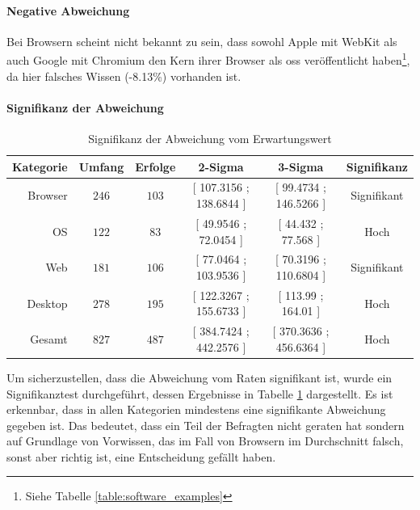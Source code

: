 \documentclass[a4paper]{article}
\begin{document}
                \paragraph{Negative Abweichung}
                    Bei Browsern scheint nicht bekannt zu sein, dass sowohl Apple mit WebKit als auch Google mit Chromium den Kern ihrer Browser als \gls{oss} veröffentlicht haben\footnote{Siehe Tabelle \ref{table:software_examples}}, da hier falsches Wissen ({\scriptsize -8.13\%}) vorhanden ist.                        %
                    
                \paragraph{Signifikanz der Abweichung}
                
                \begin{table}
                    \centering
                    \begin{tabular}{rccccc}
                        Kategorie & Umfang & Erfolge & 2-Sigma & 3-Sigma & Signifikanz \\\hline\hline
                        Browser & $246$ & $103$ & \tiny{[ 107.3156 ; 138.6844 ]} & \tiny{[ 99.4734 ; 146.5266 ]} & Signifikant\\
                        OS & $122$ & $83$ & \tiny{[ 49.9546 ; 72.0454 ]} &  \tiny{[ 44.432 ; 77.568 ]} & Hoch\\
                        Web & $181$ & $106$ & \tiny{[ 77.0464 ; 103.9536 ]} &  \tiny{[ 70.3196 ; 110.6804 ]} &  Signifikant\\
                        Desktop & $278$ & $195$ & \tiny{[ 122.3267 ; 155.6733 ]} & \tiny{[ 113.99 ; 164.01 ]} & Hoch\\\hline
                        Gesamt & $827$ & $487$ & \tiny{[ 384.7424 ; 442.2576 ]} & \tiny{[ 370.3636 ; 456.6364 ]} & Hoch
                    \end{tabular}
                    \caption{Signifikanz der Abweichung vom Erwartungswert}
                    \label{table:knowledge_by_category_sigma}
                \end{table}
                
                Um sicherzustellen, dass die Abweichung vom Raten signifikant ist, wurde ein Signifikanztest durchgeführt, dessen Ergebnisse in Tabelle \ref{table:knowledge_by_category_sigma} dargestellt. Es ist erkennbar, dass in allen Kategorien mindestens eine signifikante Abweichung gegeben ist. Das bedeutet, dass ein Teil der Befragten nicht geraten hat sondern auf Grundlage von Vorwissen, das im Fall von Browsern im Durchschnitt falsch, sonst aber richtig ist, eine Entscheidung gefällt haben.
            
\end{document}
